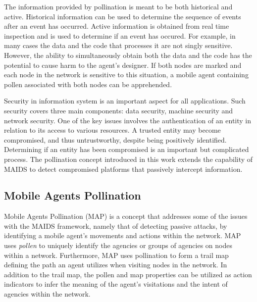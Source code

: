 \documentclass{acm_proc_article-sp}
\begin{document}
The information provided by pollination is meant to be both historical and active.  Historical information can be used to determine the sequence of events after an event has occurred.  Active information is obtained from real time inspection and is used to determine if an event has occured.  For example, in many cases the data and the code that processes it are not singly sensitive.  However, the ability to simultaneously obtain both the data and the code has the potential to cause harm to the agent's designer.  If both nodes are marked and each node in the network is sensitive to this situation, a mobile agent containing pollen associated with both nodes can be apprehended.

Security in information system is an important aspect for all applications.  Such security covers three main components: data security, machine security and network security.  One of the key issues involves the authentication of an entity in relation to its access to various resources.  A trusted entity may become compromised, and thus untrustworthy, despite being positively identified.  Determining if an entity has been compromised is an important but complicated process.  The pollination concept introduced in this work extends the capability of MAIDS to detect compromised platforms that passively intercept information.

\subsection{Mobile Agents Pollination}
Mobile Agents Pollination (MAP) is a concept that addresses some of the issues with the MAIDS framework, namely that of detecting passive attacks, by identifying a mobile agent's movements and actions within the network.  MAP uses {\it pollen} to uniquely identify the agencies or groups of agencies on nodes within a network.  Furthermore, MAP uses pollination to form a trail map defining the path an agent utilizes when visiting nodes in the network.  In addition to the trail map, the pollen and map properties can be utilized as action indicators to infer the meaning of the agent's visitations and the intent of agencies within the network.
\end{document}
